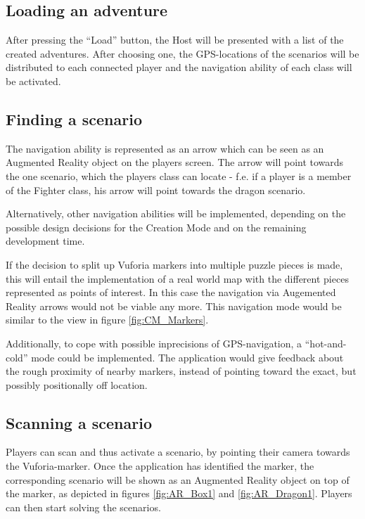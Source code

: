 \documentclass{sigchi-ext}
\begin{document}
\subsection{Loading an adventure}

After pressing the ``Load'' button, the Host will be presented with a list of the created adventures. After choosing one, the GPS-locations of the scenarios will be distributed to each connected player and the navigation ability of each class will be activated.

\subsection{Finding a scenario}

The navigation ability is represented as an arrow which can be seen as an Augmented Reality object on the players screen. The arrow will point towards the one scenario, which the players class can locate - f.e. if a player is a member of the Fighter class, his arrow will point towards the dragon scenario.

Alternatively, other navigation abilities will be implemented, depending on the possible design decisions for the Creation Mode and on the remaining development time. 

If the decision to split up Vuforia markers into multiple puzzle pieces is made, this will entail the implementation of a real world map with the different pieces represented as points of interest. In this case the navigation via Augemented Reality arrows would not be viable any more. This navigation mode would be similar to the view in figure \ref{fig:CM_Markers}.

Additionally, to cope with possible inprecisions of GPS-navigation, a ``hot-and-cold'' mode could be implemented. The application would give feedback about the rough proximity of nearby markers, instead of pointing toward the exact, but possibly positionally off location.

\subsection{Scanning a scenario}

Players can scan and thus activate a scenario, by pointing their camera towards the Vuforia-marker. Once the application has identified the marker, the corresponding scenario will be shown as an Augmented Reality object on top of the marker, as depicted in figures \ref{fig:AR_Box1} and \ref{fig:AR_Dragon1}. Players can then start solving the scenarios.
\end{document}
